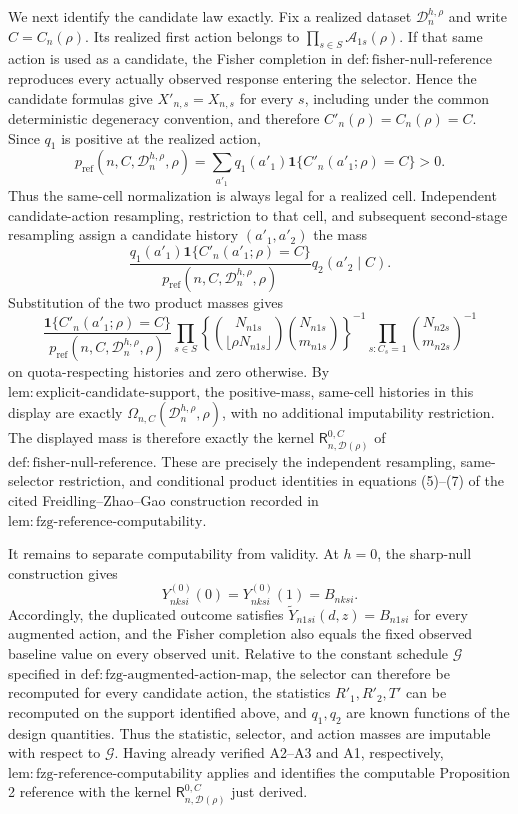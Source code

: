We next identify the candidate law exactly.  Fix a realized dataset \(\mathcal D_n^{h,\rho}\) and write \(C=C_n(\rho)\).  Its realized first action belongs to \(\prod_{s\in S}\mathcal A_{1s}(\rho)\).  If that same action is used as a candidate, the Fisher completion in \(\mathrm{def{:}fisher\mbox{-}null\mbox{-}reference}\) reproduces every actually observed response entering the selector.  Hence the candidate formulas give \(X'_{n,s}=X_{n,s}\) for every \(s\), including under the common deterministic degeneracy convention, and therefore \(C'_n(\rho)=C_n(\rho)=C\).  Since \(q_1\) is positive at the realized action,
\[
p_{\mathrm{ref}}(n,C,\mathcal D_n^{h,\rho},\rho)
=\sum_{a'_1}q_1(a'_1)\mathbf 1\{C'_n(a'_1;\rho)=C\}>0.
\]
Thus the same-cell normalization is always legal for a realized cell.  Independent candidate-action resampling, restriction to that cell, and subsequent second-stage resampling assign a candidate history \((a'_1,a'_2)\) the mass
\[
\frac{q_1(a'_1)\mathbf 1\{C'_n(a'_1;\rho)=C\}}
{p_{\mathrm{ref}}(n,C,\mathcal D_n^{h,\rho},\rho)}
q_2(a'_2\mid C).
\]
Substitution of the two product masses gives
\[
\frac{\mathbf 1\{C'_n(a'_1;\rho)=C\}}
{p_{\mathrm{ref}}(n,C,\mathcal D_n^{h,\rho},\rho)}
\prod_{s\in S}
\left\{
\binom{N_{n1s}}{\lfloor\rho N_{n1s}\rfloor}
\binom{N_{n1s}}{m_{n1s}}
\right\}^{-1}
\prod_{s:C_s=1}\binom{N_{n2s}}{m_{n2s}}^{-1}
\]
on quota-respecting histories and zero otherwise.  By \(\mathrm{lem{:}explicit\mbox{-}candidate\mbox{-}support}\), the positive-mass, same-cell histories in this display are exactly \(\Omega_{n,C}(\mathcal D_n^{h,\rho},\rho)\), with no additional imputability restriction.  The displayed mass is therefore exactly the kernel \(\mathsf R_{n,\mathcal D(\rho)}^{0,C}\) of \(\mathrm{def{:}fisher\mbox{-}null\mbox{-}reference}\).  These are precisely the independent resampling, same-selector restriction, and conditional product identities in equations (5)--(7) of the cited Freidling--Zhao--Gao construction recorded in \(\mathrm{lem{:}fzg\mbox{-}reference\mbox{-}computability}\).

It remains to separate computability from validity.  At \(h=0\), the sharp-null construction gives
\[
Y^{(0)}_{nksi}(0)=Y^{(0)}_{nksi}(1)=B_{nksi}.
\]
Accordingly, the duplicated outcome satisfies \(\widetilde Y_{n1si}(d,z)=B_{n1si}\) for every augmented action, and the Fisher completion also equals the fixed observed baseline value on every observed unit.  Relative to the constant schedule \(\mathcal G\) specified in \(\mathrm{def{:}fzg\mbox{-}augmented\mbox{-}action\mbox{-}map}\), the selector can therefore be recomputed for every candidate action, the statistics \(R'_1,R'_2,T'\) can be recomputed on the support identified above, and \(q_1,q_2\) are known functions of the design quantities.  Thus the statistic, selector, and action masses are imputable with respect to \(\mathcal G\).  Having already verified A2--A3 and A1, respectively, \(\mathrm{lem{:}fzg\mbox{-}reference\mbox{-}computability}\) applies and identifies the computable Proposition 2 reference with the kernel \(\mathsf R_{n,\mathcal D(\rho)}^{0,C}\) just derived.

